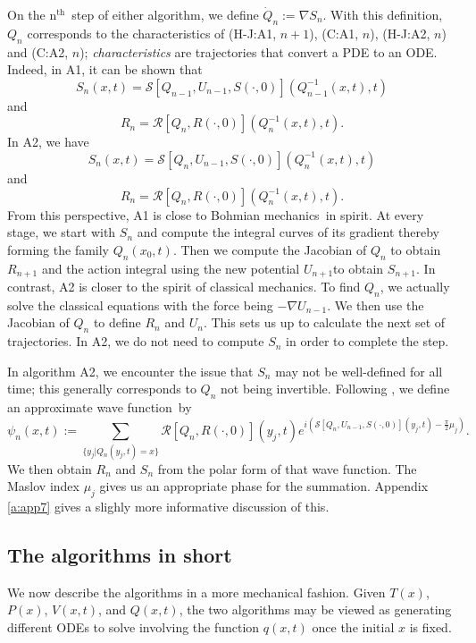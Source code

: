 \documentclass[11pt]{article}
\theoremstyle{remark}
\begin{document}
On the \ensuremath{\text{n}^{\text{th}}}\ step of either algorithm, we define $\dot{Q}_n \ensuremath{:=}
\nabla S_n$. With this definition, $Q_n$  corresponds to the characteristics
of (H-J:A1, 
$n+1$), (C:A1, $n$), (H-J:A2,
$n$) and (C:A2, $n$); \emph{characteristics} are trajectories that
convert a PDE to an ODE. Indeed, in A1, it can be shown that 
\[ S_{n} (x,t) = \ensuremath{\mathcal{S}}[Q_{n-1}, U_{n-1}, S(\cdot, 0)] (Q_{n-1}^{-1} (x, t), t) 
\]
 and 
\[R_n = \ensuremath{\mathcal{R}}[Q_n, R(\cdot, 0)] (Q_n^{-1} (x,t), t).
\]
In A2, we have 
\[ S_{n} (x,t) = \ensuremath{\mathcal{S}}[Q_{n}, U_{n-1}, S(\cdot, 0)] (Q_n^{-1} (x, t), t) 
\]and \[
R_n = \ensuremath{\mathcal{R}}[Q_n, R(\cdot, 0)] (Q_n^{-1} (x,t), t).
\]
From this perspective, A1 is close to Bohmian mechanics\ in spirit. At every stage,
we start with $S_n$ and compute the integral curves of its gradient
thereby forming the family $Q_n(x_0,t)$. 
Then  we compute the Jacobian of $Q_n$ to obtain $R_{n+1}$ and
the action integral using the new potential $U_{n+1}$to obtain $S_{n+1}$. In
contrast, A2 is 
closer to the spirit of classical mechanics. To find $Q_n$,
we actually solve the classical equations with the force being
$-\nabla U_{n-1}$. We then use the Jacobian of $Q_n$ to define $R_n$ and
$U_n$. This sets us up to calculate the next set of trajectories. In A2, we
do not need to compute $S_n$ in order to complete the step. 


In algorithm A2, we encounter the issue that $S_n$ may not be
well-defined for all time; this generally corresponds to $Q_n$ not being
invertible. Following \cite[pages~438--445]{Arn89},  we define
 an approximate wave function\ by 
\[
{\ensuremath{\psi}}_n (x, t)  \ensuremath{:=} \sum_{ \{y_j | Q_n(y_j, t) = x \} } \ensuremath{\mathcal{R}} [Q_n,
 R(\cdot,0)] (y_j,  t)  
e^{i(\ensuremath{\mathcal{S}}[Q_n, U_{n-1}, S(\cdot, 0)] (y_j, t) -
 \frac{\pi}{2} \mu_j)}.
\]
We then obtain $R_n$ and $S_n$ from the polar form of that wave function. 
 The Maslov
index $\mu_j$ gives us an appropriate phase for the summation. 
 Appendix  \ref{a:app7} gives a slighly more informative discussion of this. 

\subsection{The algorithms in short} \label{as:short}

We now describe the algorithms in a more mechanical fashion. Given $T(x)$,
$P(x)$, $V(x,t)$, and $Q(x,t)$, the two algorithms may be viewed as generating
different ODEs to solve involving the function $q(x,t)$ once the
initial $x$ is fixed. 
\end{document}
